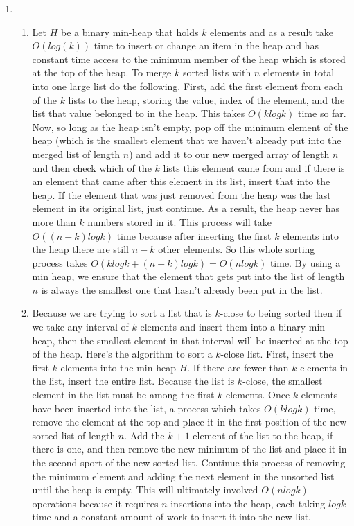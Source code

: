 \documentclass{article}
\begin{document}
\begin{enumerate}
	
	\item
	\begin{enumerate}
		\item  Let $H$ be a binary min-heap that holds $k$ elements and as a result take $O(log(k))$ time to insert or change an item in the heap and has constant time access to the minimum member of the heap which is stored at the top of the heap.  To merge $k$ sorted lists with $n$ elements in total into one large list do the following.  First, add the first element from each of the $k$ lists to the heap, storing the value, index of the element, and the list that value belonged to in the heap.  This takes $O(klogk)$ time so far.  Now, so long as the heap isn't empty, pop off the minimum element of the heap (which is the smallest element that we haven't already put into the merged list of length $n$) and add it to our new merged array of length $n$ and then check which of the $k$ lists this element came from and if there is an element that came after this element in its list, insert that into the heap.  If the element that was just removed from the heap was the last element in its original list, just continue.  As a result, the heap never has more than $k$ numbers stored in it.  This process will take $O((n-k)logk)$ time because after inserting the first $k$ elements into the heap there are still $n-k$ other elements.  So this whole sorting process takes $O(klogk + (n-k)logk) = O(nlogk)$ time. By using a min heap, we ensure that the element that gets put into the list of length $n$ is always the smallest one that hasn't already been put in the list.  
		
		\item Because we are trying to sort a list that is $k$-close to being sorted then if we take any interval of $k$ elements and insert them into a binary min-heap, then the smallest element in that interval will be inserted at the top of the heap.  Here's the algorithm to sort a $k$-close list.  First, insert the first $k$ elements into the min-heap $H$.  If there are fewer than $k$ elements in the list, insert the entire list.  Because the list is $k$-close, the smallest element in the list must be among the first $k$ elements.  Once $k$ elements have been inserted into the list, a process which takes $O(klogk)$ time, remove the element at the top and place it in the first position of the new sorted list of length $n$.  Add the $k+1$ element of the list to the heap, if there is one, and then remove the new minimum of the list and place it in the second sport of the new sorted list.  Continue this process of removing the minimum element and adding the next element in the unsorted list until the heap is empty.  This will ultimately involved $O(nlogk)$ operations because it requires $n$ insertions into the heap, each taking $logk$ time and a constant amount of work to insert it into the new list.  
	\end{enumerate}
	

\end{enumerate}
\end{document}

